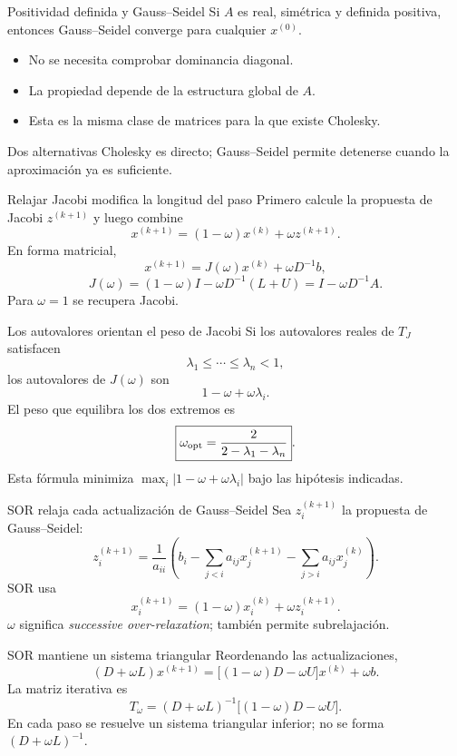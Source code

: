 \documentclass[aspectratio=169,12pt]{beamer}
\begin{document}
\begin{frame}{Positividad definida y Gauss--Seidel}
Si $A$ es real, simétrica y definida positiva, entonces Gauss--Seidel converge
para cualquier $x^{(0)}$.
\begin{itemize}
  \item No se necesita comprobar dominancia diagonal.
  \item La propiedad depende de la estructura global de $A$.
  \item Esta es la misma clase de matrices para la que existe Cholesky.
\end{itemize}
\begin{block}{Dos alternativas}
Cholesky es directo; Gauss--Seidel permite detenerse cuando la aproximación ya
es suficiente.
\end{block}
\end{frame}

\begin{frame}{Relajar Jacobi modifica la longitud del paso}
Primero calcule la propuesta de Jacobi $z^{(k+1)}$ y luego combine
\[
x^{(k+1)}=(1-\omega)x^{(k)}+\omega z^{(k+1)}.
\]
En forma matricial,
\[
x^{(k+1)}=J(\omega)x^{(k)}+\omega D^{-1}b,
\]
\[
J(\omega)=(1-\omega)I-\omega D^{-1}(L+U)
=I-\omega D^{-1}A.
\]
Para $\omega=1$ se recupera Jacobi.
\end{frame}

\begin{frame}{Los autovalores orientan el peso de Jacobi}
Si los autovalores reales de $T_J$ satisfacen
\[
\lambda_1\leq\cdots\leq\lambda_n<1,
\]
los autovalores de $J(\omega)$ son
\[
1-\omega+\omega\lambda_i.
\]
El peso que equilibra los dos extremos es
\[
\boxed{\omega_{\rm opt}=\frac{2}{2-\lambda_1-\lambda_n}}.
\]
Esta fórmula minimiza $\max_i|1-\omega+\omega\lambda_i|$ bajo las hipótesis
indicadas.
\end{frame}

\begin{frame}{SOR relaja cada actualización de Gauss--Seidel}
Sea $z_i^{(k+1)}$ la propuesta de Gauss--Seidel:
\[
z_i^{(k+1)}=\frac{1}{a_{ii}}\left(
b_i-\sum_{j<i}a_{ij}x_j^{(k+1)}
-\sum_{j>i}a_{ij}x_j^{(k)}\right).
\]
SOR usa
\[
\boxed{x_i^{(k+1)}
=(1-\omega)x_i^{(k)}+\omega z_i^{(k+1)}}.
\]
$\omega$ significa \emph{successive over-relaxation}; también permite
subrelajación.
\end{frame}

\begin{frame}{SOR mantiene un sistema triangular}
Reordenando las actualizaciones,
\[
(D+\omega L)x^{(k+1)}
=\bigl[(1-\omega)D-\omega U\bigr]x^{(k)}+\omega b.
\]
La matriz iterativa es
\[
\boxed{T_\omega=(D+\omega L)^{-1}
\bigl[(1-\omega)D-\omega U\bigr]}.
\]
En cada paso se resuelve un sistema triangular inferior; no se forma
$(D+\omega L)^{-1}$.
\end{frame}
\end{document}
